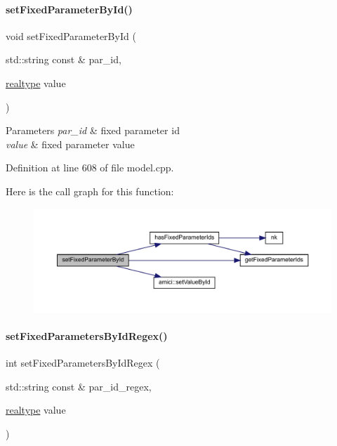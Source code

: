 \paragraph{\texorpdfstring{setFixedParameterById()}{setFixedParameterById()}}
{\footnotesize\ttfamily void set\+Fixed\+Parameter\+By\+Id (\begin{DoxyParamCaption}\item[{std\+::string const \&}]{par\+\_\+id,  }\item[{\mbox{\hyperlink{namespaceamici_a1bdce28051d6a53868f7ccbf5f2c14a3}{realtype}}}]{value }\end{DoxyParamCaption})}


\begin{DoxyParams}{Parameters}
{\em par\+\_\+id} & fixed parameter id \\
\hline
{\em value} & fixed parameter value \\
\hline
\end{DoxyParams}


Definition at line 608 of file model.\+cpp.

Here is the call graph for this function\+:
\nopagebreak
\begin{figure}[H]
\begin{center}
\leavevmode
\includegraphics[width=350pt]{classamici_1_1_model_adc0d24343c6fed2e797fb402f7c2d256_cgraph}
\end{center}
\end{figure}
\mbox{\label{classamici_1_1_model_acda9b9debfd3d6ac77e2d27a48bfb5d6}} 
\paragraph{\texorpdfstring{setFixedParametersByIdRegex()}{setFixedParametersByIdRegex()}}
{\footnotesize\ttfamily int set\+Fixed\+Parameters\+By\+Id\+Regex (\begin{DoxyParamCaption}\item[{std\+::string const \&}]{par\+\_\+id\+\_\+regex,  }\item[{\mbox{\hyperlink{namespaceamici_a1bdce28051d6a53868f7ccbf5f2c14a3}{realtype}}}]{value }\end{DoxyParamCaption})}


